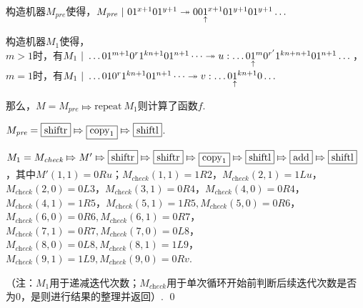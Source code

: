 \begin{pf} \rm \;

    构造机器$M_\textit{pre}$使得，$M_\textit{pre}\ | \  01^{x+1}01^{y+1}\twoheadrightarrow 00\underset{\substack{\uparrow}}{1}^{x+1}01^{y+1}01^{y+1}\dots$
    
    构造机器$M_1$使得，\\$m>1$时，有$M_1\ | \  \dots01^{m+1}0^{r}1^{kn+1}01^{n+1}\dots\twoheadrightarrow u:\dots0\underset{\substack{\uparrow}}{1}^{m}0^{r'}1^{kn+n+1}01^{n+1}\dots$，\\$m=1$时，有$M_1\ | \  \dots010^{r}1^{kn+1}01^{n+1}\dots\twoheadrightarrow v:\dots0\underset{\substack{\uparrow}}{1}^{kn+1}0\dots$
    
    那么，$M=M_\textit{pre}\Mapsto\mathrm{repeat}\ M_1$则计算了函数$f$.

    $M_\textit{pre} = \boxed{\textrm{shiftr}} \Mapsto \boxed{\textrm{copy}_1} \Mapsto \boxed{\textrm{shiftl}}$.

    $M_1 = M_\textit{check} \Mapsto M' \Mapsto \boxed{\textrm{shiftr}} \Mapsto \boxed{\textrm{shiftr}} \Mapsto \boxed{\textrm{copy}_1} \Mapsto \boxed{\textrm{shiftl}} \Mapsto \boxed{\textrm{add}} \Mapsto \boxed{\textrm{shiftl}} $，其中$M'(1, 1) = 0Ru$；$M_\textit{check}(1, 1) = 1R2$，$M_\textit{check}(2, 1) = 1Lu$，$M_\textit{check}(2, 0) = 0L3$，$M_\textit{check}(3, 1) = 0R4$，$M_\textit{check}(4, 0) = 0R4$，$M_\textit{check}(4, 1) = 1R5$，$M_\textit{check}(5, 1) = 1R5, M_\textit{check}(5, 0) = 0R6$，$M_\textit{check}(6, 0) = 0R6, M_\textit{check}(6, 1) = 0R7$，$M_\textit{check}(7, 1) = 0R7, M_\textit{check}(7, 0) = 0L8$，
    $M_\textit{check}(8, 0) = 0L8, M_\textit{check}(8, 1) = 1L9$，
    $M_\textit{check}(9, 1) = 1L9, M_\textit{check}(9, 0) = 0Rv$.

    （注：$M_1$用于递减迭代次数；$M_\textit{check}$用于单次循环开始前判断后续迭代次数是否为0，是则进行结果的整理并返回）.
    \qed
\end{pf}
